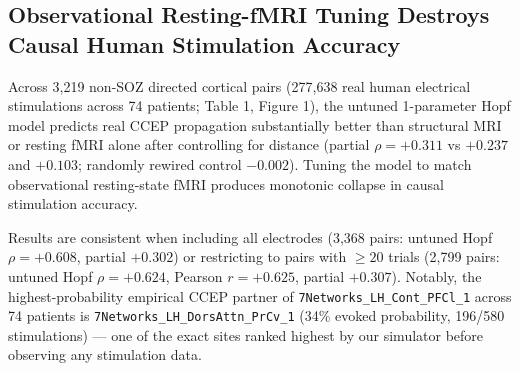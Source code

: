 \documentclass[11pt,a4paper]{article}
\begin{document}
\subsection{Observational Resting-fMRI Tuning Destroys Causal Human Stimulation Accuracy}
Across 3,219 non-SOZ directed cortical pairs (277,638 real human electrical stimulations across 74 patients; Table 1, Figure 1), the untuned 1-parameter Hopf model predicts real CCEP propagation substantially better than structural MRI or resting fMRI alone after controlling for distance (partial $\rho = +0.311$ vs $+0.237$ and $+0.103$; randomly rewired control $-0.002$). Tuning the model to match observational resting-state fMRI produces monotonic collapse in causal stimulation accuracy.

\begin{table}[htbp]
\centering
\small
{}
\end{table}
Results are consistent when including all electrodes (3,368 pairs: untuned Hopf $\rho = +0.608$, partial $+0.302$) or restricting to pairs with $\ge 20$ trials (2,799 pairs: untuned Hopf $\rho = +0.624$, Pearson $r = +0.625$, partial $+0.307$). Notably, the highest-probability empirical CCEP partner of \texttt{7Networks\_LH\_Cont\_PFCl\_1} across 74 patients is \texttt{7Networks\_LH\_DorsAttn\_PrCv\_1} (34\% evoked probability, 196/580 stimulations) --- one of the exact sites ranked highest by our simulator before observing any stimulation data.
\end{document}
